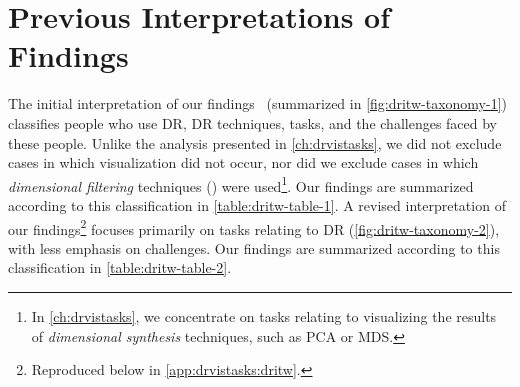 





\section{Previous Interpretations of Findings}
\label{app:drvistasks:previous-interpretations}


The initial interpretation of our findings~\cite{Sedlmair2012b} (summarized in \autoref{fig:dritw-taxonomy-1}) classifies people who use \ac{DR}, \ac{DR} techniques, tasks, and the challenges faced by these people.
Unlike the analysis presented in \autoref{ch:drvistasks}, we did not exclude cases in which visualization did not occur, nor did we exclude cases in which {\it dimensional filtering} techniques (\eg\cite{Johansson2009,Yang2003}) were used\footnote{In \autoref{ch:drvistasks}, we concentrate on tasks relating to visualizing the results of {\it dimensional synthesis} techniques, such as \ac{PCA} or \ac{MDS}.}.
Our findings are summarized according to this classification in \autoref{table:dritw-table-1}.
A revised interpretation of our findings\footnote{Reproduced below in \autoref{app:drvistasks:dritw}.} focuses primarily on tasks relating to \ac{DR} (\autoref{fig:dritw-taxonomy-2}), with less emphasis on challenges.
Our findings are summarized according to this classification in \autoref{table:dritw-table-2}.

